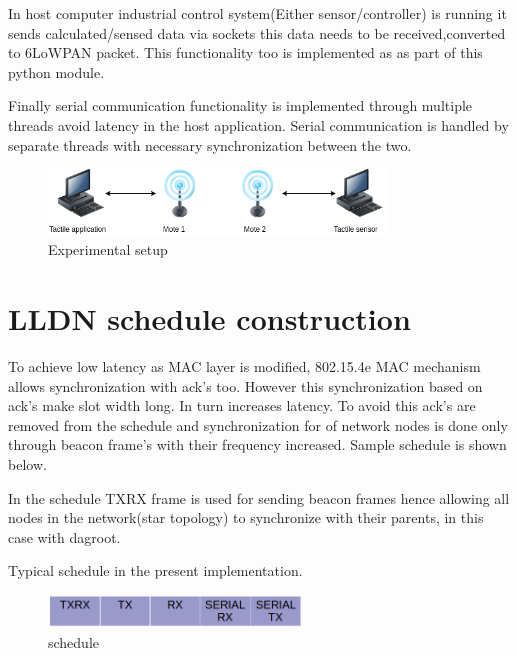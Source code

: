 In host computer industrial control system(Either sensor/controller) is running it sends calculated/sensed data via sockets this data needs to be received,converted to 6LoWPAN packet. This functionality too is implemented as as part of this python module.

Finally serial communication functionality is implemented through multiple threads avoid latency in the host application. Serial communication is handled by separate threads with necessary synchronization between the two.

\begin{figure}[H]
	\includegraphics[width=0.8\textwidth,center]{Control_loop_setup_1.png}
	\caption{Experimental setup}
	\label{fig:experimental_setup_loop1}
\end{figure}

\section{LLDN schedule construction}
To achieve low latency as MAC layer is modified, 802.15.4e MAC mechanism allows synchronization with ack's too. However this synchronization based on ack's make slot width long. In turn increases latency. To avoid this ack's are removed from the schedule and synchronization for of network nodes is done only through beacon frame's with their frequency increased. Sample schedule is shown below. \cite{Yagiz}

In the schedule TXRX frame is used for sending beacon frames hence allowing all  nodes in the network(star topology) to synchronize with their parents, in this case with dagroot.

Typical schedule in the present implementation.

\begin{figure}[H]
	\includegraphics[width=0.6\textwidth,center]{schedule_table.png}
	\caption{schedule}
	\label{fig:schedule}
\end{figure}

